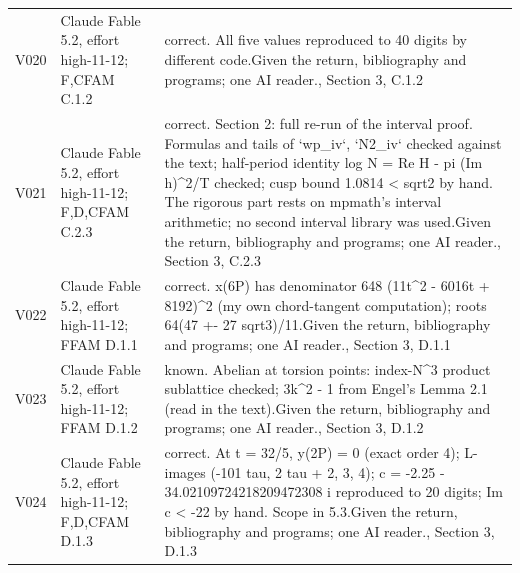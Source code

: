 \begin{longtable}{@{}L{.08\linewidth}L{.31\linewidth}L{.56\linewidth}@{}}
V020 & Claude Fable 5.2, effort high-11-12; F,C\newline FAM C.1.2 & correct. All five values reproduced to 40 digits by different code.\newline Given the return, bibliography and programs; one AI reader.\newline {}, Section 3, C.1.2\\
V021 & Claude Fable 5.2, effort high-11-12; F,D,C\newline FAM C.2.3 & correct. Section 2:\allowbreak{} full re-run of the interval proof. Formulas and tails of `wp\_\allowbreak{}iv`, `N2\_\allowbreak{}iv` checked against the text; half-period identity log N = Re H - pi (Im h)\textasciicircum{}2/\allowbreak{}T checked; cusp bound 1.0814 < sqrt2 by hand. The rigorous part rests on mpmath's interval arithmetic; no second interval library was used.\newline Given the return, bibliography and programs; one AI reader.\newline {}, Section 3, C.2.3\\
V022 & Claude Fable 5.2, effort high-11-12; F\newline FAM D.1.1 & correct. x(6P) has denominator 648 (11t\textasciicircum{}2 - 6016t + 8192)\textasciicircum{}2 (my own chord-tangent computation); roots 64(47 +- 27 sqrt3)/\allowbreak{}11.\newline Given the return, bibliography and programs; one AI reader.\newline {}, Section 3, D.1.1\\
V023 & Claude Fable 5.2, effort high-11-12; F\newline FAM D.1.2 & known. Abelian at torsion points:\allowbreak{} index-N\textasciicircum{}3 product sublattice checked; 3k\textasciicircum{}2 - 1 from Engel's Lemma 2.1 (read in the text).\newline Given the return, bibliography and programs; one AI reader.\newline {}, Section 3, D.1.2\\
V024 & Claude Fable 5.2, effort high-11-12; F,D,C\newline FAM D.1.3 & correct. At t = 32/\allowbreak{}5, y(2P) = 0 (exact order 4); L-images (-101 tau, 2 tau + 2, 3, 4); c = -2.25 - 34.0210972421\allowbreak{}8209472308 i reproduced to 20 digits; Im c < -22 by hand. Scope in 5.3.\newline Given the return, bibliography and programs; one AI reader.\newline {}, Section 3, D.1.3\\

\end{longtable}
